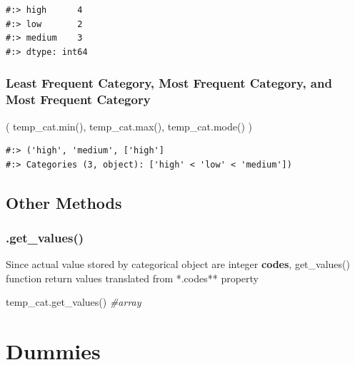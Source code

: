 \documentclass[
]{book}
\newenvironment{Shaded}{\begin{snugshade}}{\end{snugshade}}
\newcommand{\BuiltInTok}[1]{#1}
\newcommand{\CommentTok}[1]{\textcolor[rgb]{0.37,0.37,0.37}{\textit{#1}}}
\newcommand{\NormalTok}[1]{#1}
\begin{document}
\begin{verbatim}
#:> high      4
#:> low       2
#:> medium    3
#:> dtype: int64
\end{verbatim}

\hypertarget{least-frequent-category-most-frequent-category-and-most-frequent-category}{%
\subsubsection{Least Frequent Category, Most Frequent Category, and Most Frequent Category}\label{least-frequent-category-most-frequent-category-and-most-frequent-category}}

\begin{Shaded}
\begin{Highlighting}[]
\NormalTok{( temp_cat.}\BuiltInTok{min}\NormalTok{(), temp_cat.}\BuiltInTok{max}\NormalTok{(), temp_cat.mode() )}
\end{Highlighting}
\end{Shaded}

\begin{verbatim}
#:> ('high', 'medium', ['high']
#:> Categories (3, object): ['high' < 'low' < 'medium'])
\end{verbatim}

\hypertarget{other-methods-1}{%
\subsection{Other Methods}\label{other-methods-1}}

\hypertarget{get_values}{%
\subsubsection{.get\_values()}\label{get_values}}

Since actual value stored by categorical object are integer \textbf{codes}, get\_values() function return values translated from *.codes** property

\begin{Shaded}
\begin{Highlighting}[]
\NormalTok{temp_cat.get_values()  }\CommentTok{#array}
\end{Highlighting}
\end{Shaded}

\hypertarget{dummies}{%
\section{Dummies}\label{dummies}}
\end{document}
